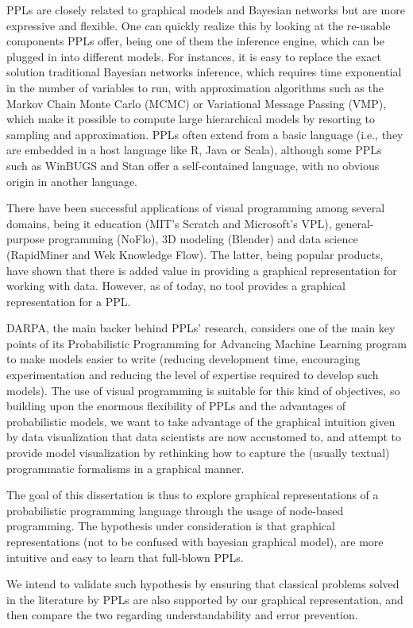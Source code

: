 PPLs are closely related to graphical models and Bayesian networks but are
more expressive and flexible. One can quickly realize this by looking at the
re-usable components PPLs offer, being one of them the inference engine, which
can be plugged in into different models. For instances, it is easy to replace
the exact solution traditional Bayesian networks inference, which requires time
exponential in the number of variables to run, with approximation algorithms
such as the Markov Chain Monte Carlo (MCMC) or Variational Message Passing
(VMP), which make it possible to compute large hierarchical models by resorting
to sampling and approximation. PPLs often extend from a basic language (i.e.,
they are embedded in a host language like R, Java or Scala), although some PPLs
such as WinBUGS and Stan offer a self-contained language, with no obvious origin
in another language.

There have been successful applications of visual programming among several
domains, being it education (MIT’s Scratch and Microsoft’s VPL), general-purpose
programming (NoFlo), 3D modeling (Blender) and data science (RapidMiner and Wek
 Knowledge Flow). The latter, being popular products, have shown that there is
 added value in providing a graphical representation for working with data.
 However, as of today, no tool provides a graphical representation for a PPL.

DARPA, the main backer behind PPLs’ research, considers one of the main key
points of its Probabilistic Programming for Advancing Machine Learning program
to make models easier to write (reducing development time, encouraging
experimentation and reducing the level of expertise required to develop such
models). The use of visual programming is suitable for this kind of objectives,
so building upon the enormous flexibility of PPLs and the advantages of
probabilistic models, we want to take advantage of the graphical intuition given
by data visualization that data scientists are now accustomed to, and attempt
to provide model visualization by rethinking how to capture
the (usually textual) programmatic formalisms in a graphical manner.

The goal of this dissertation is thus to explore graphical representations of a
probabilistic programming language through the usage of node-based programming.
The hypothesis under consideration is that graphical representations (not to be
confused with bayesian graphical model), are more intuitive and easy to learn
that full-blown PPLs.

We intend to validate such hypothesis by ensuring that classical problems solved
in the literature by PPLs are also supported by our graphical representation,
and then compare the two regarding understandability and error prevention.
